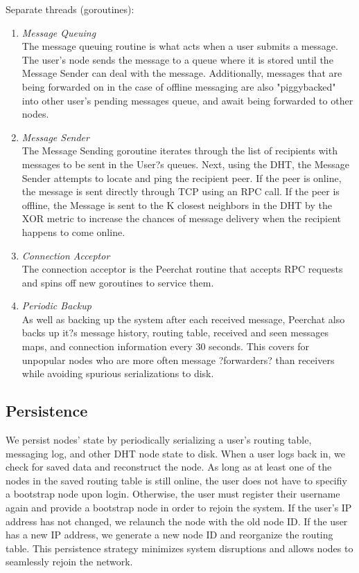 \documentclass{article}
\begin{document}
Separate threads (goroutines):
\begin{enumerate}
	\item \textit{Message Queuing} \\
	The message queuing routine is what acts when a user submits a message. The user's node sends the message to a queue where it is stored until the Message Sender can deal with the message. Additionally, messages that are being forwarded on in the case of offline messaging are also "piggybacked" into other user's pending messages queue, and await being forwarded to other nodes. 

	\item \textit{Message Sender} \\
	The Message Sending goroutine iterates through the list of recipients with messages to be sent in the User?s queues.  Next, using the DHT, the Message Sender attempts to locate and ping the recipient peer. If the peer is online, the message is sent directly through TCP using an RPC call. If the peer is offline, the Message is sent to the K closest neighbors in the DHT by the XOR metric to increase the chances of message delivery when the recipient happens to come online. 

	\item \textit{Connection Acceptor} \\
The connection acceptor is the Peerchat routine that accepts RPC requests and spins off new goroutines to service them. 

	\item \textit{Periodic Backup} \\
	As well as backing up the system after each received message, Peerchat also backs up it?s message history, routing table, received and seen messages maps, and connection information every 30 seconds. This covers for unpopular nodes who are more often message ?forwarders? than receivers while avoiding spurious serializations to disk. 
\end{enumerate}

\subsection{Persistence}

We persist nodes' state by periodically serializing a user's routing table, messaging log, and other DHT node state to disk.
When a user logs back in, we check for saved data and reconstruct the node.
As long as at least one of the nodes in the saved routing table is still online, the user does not have to specifiy a bootstrap node upon login. 
Otherwise, the user must register their username again and provide a bootstrap node in order to rejoin the system.
If the user's IP address has not changed, we relaunch the node with the old node ID. 
If the user has a new IP address, we generate a new node ID and reorganize the routing table.
This persistence strategy minimizes system disruptions and allows nodes to seamlessly rejoin the network.
\end{document}
